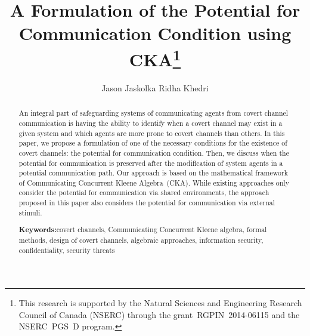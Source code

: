 \documentclass[copyright,creativecommons]{eptcs}
\makeatletter
\newcommand{\PFC}{potential for communication\@\xspace}
\newcommand{\socas}{systems of communicating agents\@\xspace}
\newcommand{\CCKA}{Communicating Concurrent Kleene Algebra\@\xspace}
\newcommand{\CCKAabbrv}{CKA\@\xspace}
\newcommand{\keywords}[1]{\par\addvspace\baselineskip\noindent
							\textbf{Keywords:}\enspace\ignorespaces#1}
\makeatother
\begin{document}
\title{A Formulation of the Potential for \\ Communication Condition using \CCKAabbrv\footnote{This research is supported by the Natural Sciences and Engineering Research Council of Canada (NSERC) through the grant~RGPIN~2014-06115 and the NSERC~PGS~D program.}}
\author{Jason Jaskolka \qquad\qquad Ridha Khedri
}
\def\titlerunning{A Formulation of the Potential for Communication Condition using \emph{\CCKAabbrv}}
\def\authorrunning{J. Jaskolka and R. Khedri}
		
\maketitle


\begin{abstract}
\vspace{-0.1in}
	An integral part of safeguarding \socas from covert channel communication is having the ability to identify when a covert channel may exist in a given system and which agents are more prone to covert channels than others. In this paper, we propose a formulation of one of the necessary conditions for the existence of covert channels: the \PFC condition. Then, we discuss when the \PFC is preserved after the modification of system agents in a potential communication path. Our approach is based on the mathematical framework of \CCKA~(\CCKAabbrv). While existing approaches only consider the potential for communication via shared environments, the approach proposed in this paper also considers the potential for communication via external stimuli.  	
	\keywords{covert channels, Communicating Concurrent Kleene algebra, formal methods, design of covert channels, algebraic approaches, information security, confidentiality, security threats}
\end{abstract}

\vspace{-0.1in}	
\end{document}
